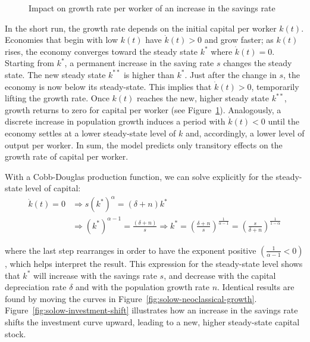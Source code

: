 \documentclass[\topdir/lecture\_notes.tex]{subfiles}
\begin{document}
\begin{figure}[h]
\begin{center}
  \caption{Impact on growth rate per worker of an increase in the savings rate}
  \label{fig:solow-savings-impact}
\end{center}
\end{figure}

In the short run, the growth rate depends on the initial capital per worker $k(t)$.
Economies that begin with low $k(t)$ have $\dot{k}(t)>0$ and grow faster; as $k(t)$ rises, the economy converges toward the steady state $k^{*}$ where $\dot{k}(t)=0$.
Starting from $k^{*}$, a permanent increase in the saving rate $s$ changes the steady state.
The new steady state $k^{**}$ is higher than $k^{*}$.
Just after the change in $s$, the economy is now below its steady-state.
This implies that $\dot{k}(t)>0$, temporarily lifting the growth rate.
Once $k(t)$ reaches the new, higher steady state $k^{**}$, growth returns to zero for capital per worker (see Figure~\ref{fig:solow-savings-impact}).
Analogously, a discrete increase in population growth induces a period with $\dot{k}(t)<0$ until the economy settles at a lower steady-state level of $k$ and, accordingly, a lower level of output per worker.
In sum, the model predicts only transitory effects on the growth rate of capital per worker.

With a Cobb-Douglas production function, we can solve explicitly for the steady-state level of capital:
\begin{equation}
\begin{aligned}
\dot{k}(t)=0 & \Longrightarrow s\left(k^{*}\right)^{\alpha}=(\delta+n) k^{*} \\
& \Longrightarrow\left(k^{*}\right)^{\alpha-1}=\frac{(\delta+n)}{s} \Longrightarrow k^{*}=\left(\frac{\delta+n}{s}\right)^{\frac{1}{\alpha-1}} =\left(\frac{s}{\delta+n}\right)^{\frac{1}{1-\alpha}}
\end{aligned}
\label{eq:solow-steady-state-k}
\end{equation}

where the last step rearranges in order to have the exponent positive $\left(\frac{1}{\alpha-1}<0\right)$, which helps interpret the result. This expression for the steady-state level shows that $k^{*}$ will increase with the savings rate $s$, and decrease with the capital depreciation rate $\delta$ and with the population growth rate $n$. Identical results are found by moving the curves in Figure~\ref{fig:solow-neoclassical-growth}. Figure~\ref{fig:solow-investment-shift} illustrates how an increase in the savings rate shifts the investment curve upward, leading to a new, higher steady-state capital stock.
\end{document}
